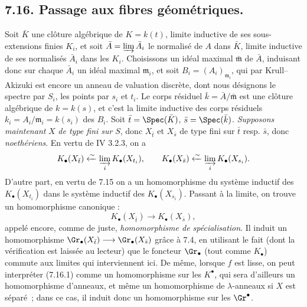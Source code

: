 \subsection*{7.16. Passage aux fibres géométriques.}
Soit \(\bar K\) une clôture algébrique de \(K=k(t)\), limite inductive de ses sous-extensions finies \(K_i\), et soit \(\bar A=\varinjlim \bar A_i\) le normalisé de \(A\) dans \(\bar K\), limite inductive de ses normalisés \(\bar A_i\) dans les \(K_i\). Choisissons un idéal maximal \(\bar{\mathfrak m}\) de \(\bar A\), induisant donc sur chaque \(\bar A_i\) un idéal maximal \(\mathfrak m_i\), et soit \(B_i=(A_i)_{\mathfrak m_i}\), qui par Krull--Akizuki est encore un anneau de valuation discrète, dont nous désignons le spectre par \(S_i\), les points par \(s_i\) et \(t_i\). Le corps résiduel \(\bar k=\bar A/\bar{\mathfrak m}\) est une clôture algébrique de \(k=k(s)\), et c'est la limite inductive des corps résiduels \(k_i=A_i/\mathfrak m_i=k(s_i)\) des \(B_i\). Soit \(\bar t=\Spec(\bar K)\), \(\bar s=\Spec(\bar k)\). \emph{Supposons maintenant} \(X\) \emph{de type fini sur} \(S\), donc \(X_{\bar t}\) et \(X_{\bar s}\) de type fini sur \(\bar t\) resp. \(\bar s\), donc \emph{noethériens}. En vertu de IV 3.2.3, on a
\[
  K_\bullet(X_{\bar t})\xleftarrow{\sim}\varinjlim_i K_\bullet(X_{t_i}),
  \qquad
  K_\bullet(X_{\bar s})\xleftarrow{\sim}\varinjlim_i K_\bullet(X_{s_i}).
\]
D'autre part, en vertu de 7.15 on a un homomorphisme du système inductif des \(K_\bullet(X_{t_i})\) dans le système inductif des \(K_\bullet(X_{s_i})\). Passant à la limite, on trouve un homomorphisme canonique :
\begin{equation}\tag{7.16.1}
  K_\bullet(X_{\bar t})\longrightarrow K_\bullet(X_{\bar s}),
\end{equation}
appelé encore, comme de juste, \emph{homomorphisme de spécialisation}. Il induit un homomorphisme \(\Gr_\bullet(X_{\bar t})\longrightarrow \Gr_\bullet(X_{\bar s})\) grâce à 7.4, en utilisant le fait (dont la vérification est laissée au lecteur) que le foncteur \(\Gr_\bullet\) (tout comme \(K_\bullet\)) commute aux limites qui interviennent ici. De même, lorsque \(f\) est lisse, on peut interpréter (7.16.1) comme un homomorphisme sur les \(K^\bullet\), qui sera d'ailleurs un homomorphisme d'anneaux, et même un homomorphisme de \(\lambda\)-anneaux si \(X\) est séparé~; dans ce cas, il induit donc un homomorphisme sur les \(\Gr^\bullet\).

